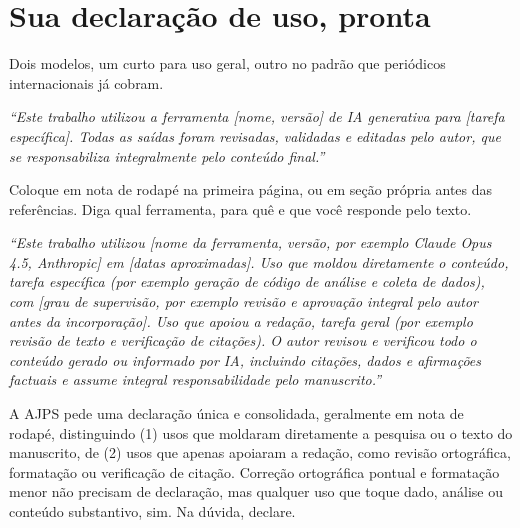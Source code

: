 \documentclass[11pt,a4paper]{article}
\newcommand{\iconBookmark}[1]{%
  \begin{tikzpicture}[baseline=-0.55ex]
    \draw[#1,line width=1pt,line join=round] (-0.11,0.15) -- (0.11,0.15) -- (0.11,-0.15) -- (0,-0.03) -- (-0.11,-0.15) -- cycle;
  \end{tikzpicture}}
\begin{document}
\section{Sua declaração de uso, pronta}
\small
Dois modelos, um curto para uso geral, outro no padrão que periódicos internacionais já cobram.
\begin{leitura}[title={\iconBookmark{white}\ \ Modelo curto, adaptado de Sampaio, Sabbatini e Limongi (2024)}]
\itshape ``Este trabalho utilizou a ferramenta [nome, versão] de IA generativa para [tarefa específica]. Todas as saídas foram revisadas, validadas e editadas pelo autor, que se responsabiliza integralmente pelo conteúdo final.''
\end{leitura}
\begin{dica}
Coloque em nota de rodapé na primeira página, ou em seção própria antes das referências. Diga qual ferramenta, para quê e que você responde pelo texto.
\end{dica}
\begin{leitura}[title={\iconBookmark{white}\ \ Modelo detalhado, segundo a AJPS AI Policy (2026)}]
\itshape ``Este trabalho utilizou [nome da ferramenta, versão, por exemplo Claude Opus 4.5, Anthropic] em [datas aproximadas]. Uso que moldou diretamente o conteúdo, tarefa específica (por exemplo geração de código de análise e coleta de dados), com [grau de supervisão, por exemplo revisão e aprovação integral pelo autor antes da incorporação]. Uso que apoiou a redação, tarefa geral (por exemplo revisão de texto e verificação de citações). O autor revisou e verificou todo o conteúdo gerado ou informado por IA, incluindo citações, dados e afirmações factuais e assume integral responsabilidade pelo manuscrito.''
\end{leitura}
\begin{dica}
A AJPS pede uma declaração única e consolidada, geralmente em nota de rodapé, distinguindo (1) usos que moldaram diretamente a pesquisa ou o texto do manuscrito, de (2) usos que apenas apoiaram a redação, como revisão ortográfica, formatação ou verificação de citação. Correção ortográfica pontual e formatação menor não precisam de declaração, mas qualquer uso que toque dado, análise ou conteúdo substantivo, sim. Na dúvida, declare.
\end{dica}

\end{document}
